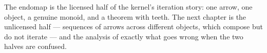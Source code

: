 The endomap is the licensed half of the kernel's iteration story: one
arrow, one object, a genuine monoid, and a theorem with teeth. The next
chapter is the unlicensed half --- sequences of arrows across different
objects, which compose but do not iterate --- and the analysis of exactly
what goes wrong when the two halves are confused.
